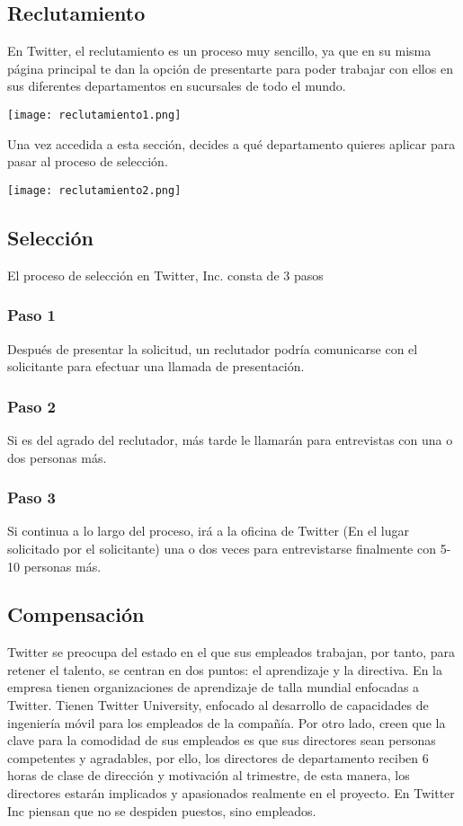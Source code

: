\subsection{Reclutamiento}

En Twitter, el reclutamiento es un proceso muy sencillo, ya que en su misma página principal te dan la opción de presentarte para poder trabajar con ellos en sus diferentes departamentos en sucursales de todo el mundo.

\texttt{[image: reclutamiento1.png]}

Una vez accedida a esta sección, decides a qué departamento quieres aplicar para pasar al proceso de selección.

\texttt{[image: reclutamiento2.png]}

\subsection{Selección}

El proceso de selección en Twitter, Inc. consta de 3 pasos

\subsubsection{Paso 1}
Después de presentar la solicitud, un reclutador podría comunicarse con el solicitante para efectuar una llamada de presentación.

\subsubsection{Paso 2}
Si es del agrado del reclutador, más tarde le llamarán para entrevistas con una o dos personas más.

\subsubsection{Paso 3}
Si continua a lo largo del proceso, irá a la oficina de Twitter (En el lugar solicitado por el solicitante) una o dos veces para entrevistarse finalmente con 5-10 personas más.

\subsection{Compensación}

Twitter se preocupa del estado en el que sus empleados trabajan, por tanto, para retener el talento, se centran en dos puntos: el aprendizaje y la directiva.
En la empresa tienen organizaciones de aprendizaje de talla mundial enfocadas a Twitter. Tienen Twitter University, enfocado al desarrollo de capacidades de ingeniería móvil para los empleados de la compañía. Por otro lado, creen que la clave para la comodidad de sus empleados es que sus directores sean personas competentes y agradables, por ello, los directores de departamento reciben 6 horas de clase de dirección y motivación al trimestre, de esta manera, los directores estarán implicados y apasionados realmente en el proyecto. En Twitter Inc piensan que no se despiden puestos, sino empleados.


